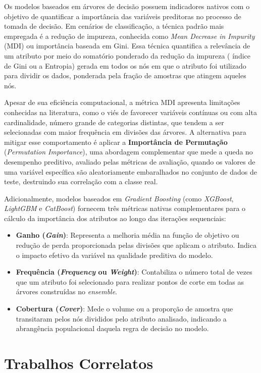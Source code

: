 Os modelos baseados em árvores de decisão possuem indicadores nativos com o objetivo de quantificar a importância das variáveis preditoras no processo de tomada de decisão. Em cenários de classificação, a técnica padrão mais empregada é a redução de impureza, conhecida como \textit{Mean Decrease in Impurity} (MDI) ou importância baseada em Gini. Essa técnica quantifica a relevância de um atributo por meio do somatório ponderado da redução da impureza ( índice de Gini ou a Entropia) gerada em todos os nós em que o atributo foi utilizado para dividir os dados, ponderada pela fração de amostras que atingem aqueles nós.

Apesar de sua eficiência computacional, a métrica MDI apresenta limitações conhecidas na literatura, como o viés de favorecer variáveis contínuas ou com alta cardinalidade, número grande de categorias distintas, que tendem a ser selecionadas com maior frequência em divisões das árvores. A alternativa para mitigar esse comportamento é aplicar a \textbf{Importância de Permutação} (\textit{Permutation Importance}), uma abordagem complementar que mede a queda no desempenho preditivo, avaliado pelas métricas de avaliação, quando os valores de uma variável específica são aleatoriamente embaralhados no conjunto de dados de teste, destruindo sua correlação com a classe real.

Adicionalmente, modelos baseados em \textit{Gradient Boosting} (como \textit{XGBoost}, \textit{LightGBM} e \textit{CatBoost}) fornecem três métricas nativas complementares para o cálculo da importância dos atributos ao longo das iterações sequenciais:
\begin{itemize}
	\item \textbf{Ganho (\textit{Gain})}: Representa a melhoria média na função de objetivo ou redução de perda proporcionada pelas divisões que aplicam o atributo. Indica o impacto efetivo da variável na qualidade preditiva do modelo.
	\item \textbf{Frequência (\textit{Frequency} ou \textit{Weight})}: Contabiliza o número total de vezes que um atributo foi selecionado para realizar pontos de corte em todas as árvores construídas no \textit{ensemble}.
	\item \textbf{Cobertura (\textit{Cover})}: Mede o volume ou a proporção de amostra que transitaram pelos nós divididos pelo atributo analisado, indicando a abrangência populacional daquela regra de decisão no modelo.
\end{itemize}

\section{Trabalhos Correlatos}

